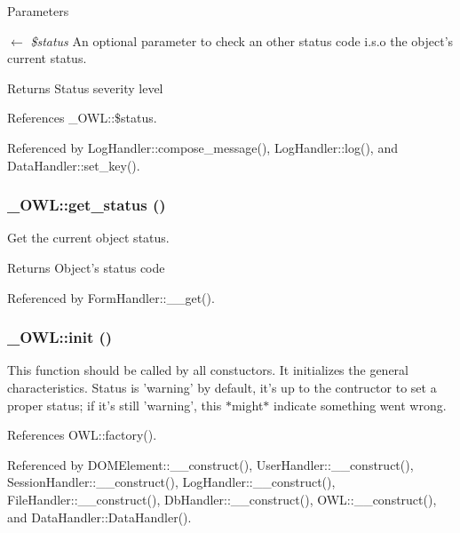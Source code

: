 \begin{DoxyParams}{Parameters}
\item[\mbox{$\leftarrow$} {\em \$status}]An optional parameter to check an other status code i.s.o the object's current status. \end{DoxyParams}
\begin{DoxyReturn}{Returns}
Status severity level 
\end{DoxyReturn}


References \_\-OWL::\$status.



Referenced by LogHandler::compose\_\-message(), LogHandler::log(), and DataHandler::set\_\-key().

\subsubsection[{get\_\-status}]{\setlength{\rightskip}{0pt plus 5cm}\_\-OWL::get\_\-status ()}\label{class__OWL_a99ec771fa2c5c279f80152cc09e489a8}
Get the current object status.

\begin{DoxyReturn}{Returns}
Object's status code 
\end{DoxyReturn}


Referenced by FormHandler::\_\-\_\-get().

\subsubsection[{init}]{\setlength{\rightskip}{0pt plus 5cm}\_\-OWL::init ()}\label{class__OWL_ae0ef3ded56e8a6b34b6461e5a721cd3e}
This function should be called by all constuctors. It initializes the general characteristics. Status is 'warning' by default, it's up to the contructor to set a proper status; if it's still 'warning', this $\ast$might$\ast$ indicate something went wrong. 

References OWL::factory().



Referenced by DOMElement::\_\-\_\-construct(), UserHandler::\_\-\_\-construct(), SessionHandler::\_\-\_\-construct(), LogHandler::\_\-\_\-construct(), FileHandler::\_\-\_\-construct(), DbHandler::\_\-\_\-construct(), OWL::\_\-\_\-construct(), and DataHandler::DataHandler().

